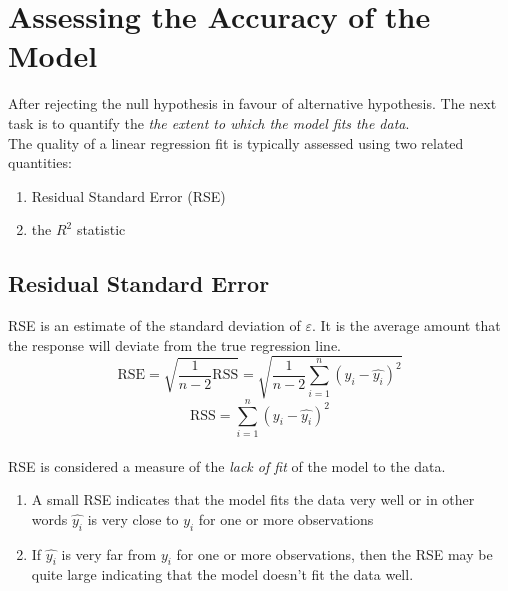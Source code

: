 \documentclass{article}
\begin{document}
\section*{Assessing the Accuracy of the Model}
After rejecting the null hypothesis in favour of alternative hypothesis. The next task is to quantify the \textit{the extent to which the model fits the data}. \\ The quality of a linear regression fit is typically assessed using two related quantities:
\begin{enumerate}
    \item Residual Standard Error (RSE)
    \item the $R^{2}$ statistic
\end{enumerate}
\subsection*{Residual Standard Error} 
RSE is an estimate of the standard deviation of $\varepsilon$. It is the average amount that the response will deviate from the true regression line. 
\begin{equation*} \text{RSE} = \sqrt{\frac{1}{n-2}\text{RSS}} = \sqrt{\frac{1}{n-2} \sum_{i=1}^{n} {(y_i - \hat{y_i})}^2 } \end{equation*}
\begin{equation*} \text{RSS} = \sum_{i=1}^{n} {(y_i - \hat{y_i})}^2 \end{equation*}
\\[2mm] 
RSE is considered a measure of the \textit{lack of fit} of the model to the data.
\begin{enumerate}
    \item A small RSE indicates that the model fits the data very well or in other words $\hat{y_i}$ is very close to $y_i$ for one or more observations 
    \item If $\hat{y_i}$ is very far from $y_i$ for one or more observations, then the RSE may be quite large indicating that the model doesn't fit the data well.
\end{enumerate}
\vspace{3mm}
\end{document}
